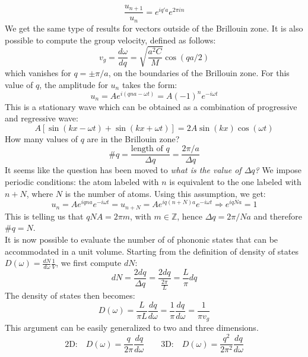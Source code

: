 \documentclass[10.75pt,a4paper,openright,bottom=2cm]{article}
\begin{document}
\[
\frac{u_{n+1}}{u_n}=e^{iq'a}e^{2\pi in}
\]
We get the same type of results for vectors outside of the  Brillouin zone. It is also possible to compute the group velocity, defined as follows:
\[
v_g=\frac{d\omega}{dq}=\sqrt{\frac{a^2C}{M}}\cos(qa/2)
\]
which vanishes for $q=\pm\pi/a$, on the boundaries of the  Brillouin zone. For this value of $q$, the amplitude for $u_n$ takes the form:
\[
u_n=Ae^{i(qna-\omega t)}=A(-1)^ne^{-i\omega t}
\]
This is a stationary wave which can be obtained as a combination of progressive and regressive wave:
\[
A[\sin(kx-\omega t)+\sin(kx+\omega t)]=2A\sin(kx)\cos(\omega t)
\]
How many values of $q$ are in the  Brillouin zone?
\[
\#q=\frac{\text{length of $q$}}{\Delta q}=\frac{2\pi/a}{\Delta q}
\]
It seems like the question has been moved to \textit{what is the value of $\Delta q$?} We impose periodic conditions: the atom labeled with $n$ is equivalent to the one labeled with $n+N$, where $N$ is the number of atoms. Using this assumption, we get:
\[
u_n=Ae^{iqna}e^{-i\omega t}=u_{n+N}=Ae^{iq(n+N)a}e^{-i\omega t}\Rightarrow e^{iqNa}=1
\]
This is telling us that $qNA=2\pi m$, with $m\in\mathbb{Z}$, hence $\Delta q=2\pi/Na$ and therefore $\#q=N$.\\
It is now possible to evaluate the number of of phononic states that can be accommodated in a unit volume. Starting from the definition of density of states $D(\omega)=\frac{dN}{d\omega}\frac{1}{V}$, we first compute $dN$:
\[
dN=\frac{2dq}{\Delta q}=\frac{2dq}{\frac{2\pi}{L}}=\frac{L}{\pi}dq
\]
The density of states then becomes:
\[
D(\omega)=\frac{L}{\pi L}\frac{dq}{d\omega}=\frac{1}{\pi}\frac{dq}{d\omega}=\frac{1}{\pi v_g}
\]
This argument can be easily generalized to two and three dimensions.
\[
\text{2D:}\quad D(\omega)=\frac{q}{2\pi}\frac{dq}{d\omega} \qquad \text{3D:}\quad D(\omega)=\frac{q^2}{2\pi^2}\frac{dq}{d\omega}
\]
\end{document}

